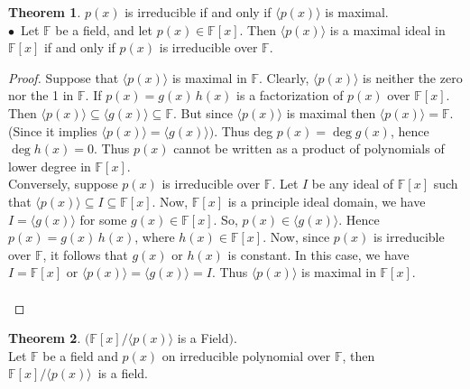 \documentclass[11pt,a4paper]{article}
\theoremstyle{definition}
\newtheorem{thm}{Theorem}[subsection]
\begin{document}
\begin{thm}
$p(x)$ is irreducible if and only if $\langle p(x)\rangle $ is maximal.\\

$\bullet\,$ Let $\mathbb{F}$ be a field, and let $p(x) \in \mathbb{F}[x]$. Then $\langle p(x) \rangle$ is a maximal ideal in $\mathbb{F}[x]$ if and only if $p(x)$ is irreducible over $\mathbb{F}$.\\
\end{thm}


\begin{proof}
Suppose that $\langle p(x)\rangle$ is maximal in $\mathbb{F}$. Clearly, $\langle p(x)\rangle$ is neither the zero nor the 1 in $\mathbb{F}$. If $p(x) = g(x)\, h(x)$ is a factorization of $p(x)$ over $\mathbb{F}[x]$. Then $\langle p(x) \rangle \subseteq \langle g(x)\rangle \subseteq \mathbb{F}$. But since $\langle p(x)\rangle$ is maximal then $\langle p(x)\rangle = \mathbb{F}$. (Since it implies $\langle p(x) \rangle = \langle g(x)\rangle)$. Thus deg $p(x) = \deg g(x)$, hence $\deg h(x) = 0$. Thus $p(x)$ cannot be written as a product of polynomials of lower degree in $\mathbb{F}[x]$.\\
Conversely, suppose $p(x)$ is irreducible over $\mathbb{F}$. Let $I$ be any ideal of $\mathbb{F}[x]$ such that $\langle p(x) \rangle \subseteq I \subseteq \mathbb{F}[x]$. Now, $\mathbb{F}[x]$ is a principle ideal domain, we have $I = \langle g(x)\rangle$ for some $g(x)\in \mathbb{F}[x]$. So, $p(x)\in \langle g(x)\rangle$. Hence $p(x) = g(x)\, h(x)$, where $h(x)\in \mathbb{F}[x]$. Now, since $p(x)$ is irreducible over $\mathbb{F}$, it follows that $g(x)$ or $h(x)$ is constant. In this case, we have $I = \mathbb{F}[x]$ or $\langle p(x) \rangle = \langle g(x)\rangle = I$. Thus $\langle p(x)\rangle$ is maximal in $\mathbb{F}[x]$.\\\\
\end{proof}









\begin{thm}
$\Big(\mathbb{F}[x]/\langle p(x)\rangle$ is a Field$\Big)$.\\
Let $\mathbb{F}$ be a field and $p(x)$ on irreducible polynomial over $\mathbb{F}$, then $\mathbb{F}[x]/\langle p(x)\rangle\, $ is a field.\\\\
\end{thm}
\end{document}
